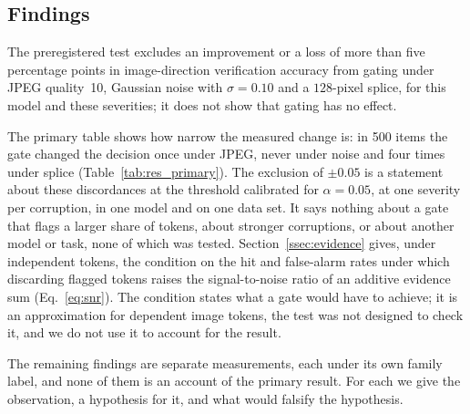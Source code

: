
\subsection{Findings}\label{ssec:disc_findings}
The preregistered test excludes an improvement or a loss of more than five percentage points in image-direction verification accuracy
from gating under JPEG quality~10, Gaussian noise with $\sigma=0.10$ and a $128$-pixel splice, for this model and these severities; it
does not show that gating has no effect.

The primary table shows how narrow the measured change is: in 500 items the gate changed the decision once under JPEG, never under
noise and four times under splice (Table~\ref{tab:res_primary}).
The exclusion of $\pm0.05$ is a statement about these discordances at the threshold calibrated for $\alpha=0.05$, at one severity per
corruption, in one model and on one data set.
It says nothing about a gate that flags a larger share of tokens, about stronger corruptions, or about another model or task, none of
which was tested.
Section~\ref{ssec:evidence} gives, under independent tokens, the condition on the hit and false-alarm rates under which discarding
flagged tokens raises the signal-to-noise ratio of an additive evidence sum (Eq.~\eqref{eq:snr}).
The condition states what a gate would have to achieve; it is an approximation for dependent image tokens, the test was not designed to
check it, and we do not use it to account for the result.

The remaining findings are separate measurements, each under its own family label, and none of them is an account of the primary result.
For each we give the observation, a hypothesis for it, and what would falsify the hypothesis.

